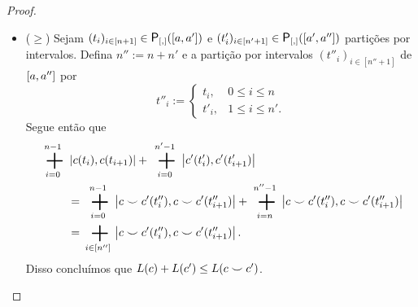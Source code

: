 \begin{proof}
\begin{itemize}
	\item ($\geq$) Sejam $(t_i)_{i \in [n+1]} \in \Partinter(\intff{a}{a'})$ e $(t'_i)_{i \in [n'+1]} \in \Partinter(\intff{a'}{a''})$ partições por intervalos. Defina $n'' := n+n'$ e a partição por intervalos $(t''_i)_{i \in [n''+1]}$ de $\left[a,\allowbreak a''\right]$ por
		\begin{equation*}
		t''_i := \begin{cases}
				t_i,	& 0 \leq i \leq n \\
				t'_i,	& 1 \leq i \leq n'.
				\end{cases}
		\end{equation*}
	Segue então que
		\begin{align*}
		\sum_{i=0}^{n-1}& \dist{c(t_i)}{c(t_{i+1})} + \sum_{i=0}^{n'-1} \dist{c'(t'_i)}{c'(t'_{i+1})} \\
			&= \sum_{i=0}^{n-1} \dist{c \conca c'(t''_i)}{c \conca c'(t''_{i+1})} + \sum_{i=n}^{n''-1} \dist{c \conca c'(t''_i)}{c \conca c'(t''_{i+1})} \\
			&= \sum_{i \in [n'']} \dist{c \conca c'(t''_i)}{c \conca c'(t''_{i+1})}.
		\end{align*}
	Disso concluímos que $L(c) + L(c') \leq L(c \smile c')$.
	\end{itemize}
\end{proof}

